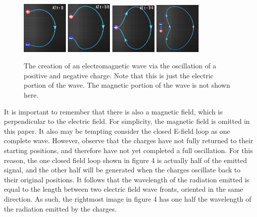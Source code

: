 \documentclass[12pt]{article}
\begin{document}
\begin{figure}[h]
    \centering
    \includegraphics[width=0.20\textwidth]{dipole-at-t0.png} 
    \includegraphics[width=0.20\textwidth]{dipole-at-t1.png}
    \includegraphics[width=0.20\textwidth]{dipole-at-t2.png}
    \includegraphics[width=0.20\textwidth]{dipole-at-t3.png}
    \caption{\cite{lesic}The creation of an electromagnetic wave via the oscillation of a positive and negative charge. Note that this is just the electric portion of the wave. The magnetic portion of the wave is not shown here.}
\end{figure}

It is important to remember that there is also a magnetic field, which is perpendicular to the electric field. For simplicity, the magnetic field is omitted in this paper. It also may be tempting consider the closed E-field loop as one complete wave. However, observe that the charges have not fully returned to their starting positions, and therefore have not yet completed a full oscillation. For this reason, the one closed field loop shown in figure 4 is actually half of the emitted signal, and the other half will be generated when the charges oscillate back to their original positions. It follows that the wavelength of the radiation emitted is equal to the length between two electric field wave fronts, oriented in the same direction. As such, the rightmost image in figure 4 has one half the wavelength of the radiation emitted by the charges.
\end{document}
